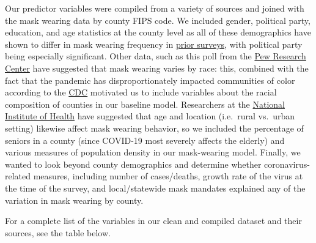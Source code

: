 \documentclass[
]{article}
\begin{document}
Our predictor variables were compiled from a variety of sources and
joined with the mask wearing data by county FIPS code. We included
gender, political party, education, and age statistics at the county
level as all of these demographics have shown to differ in mask wearing
frequency in
\href{https://news.gallup.com/poll/315590/americans-face-mask-usage-varies-greatly-demographics.aspx}{prior
surveys}, with political party being especially significant. Other data,
such as this poll from the
\href{https://www.pewresearch.org/fact-tank/2020/06/23/most-americans-say-they-regularly-wore-a-mask-in-stores-in-the-past-month-fewer-see-others-doing-it/}{Pew
Research Center} have suggested that mask wearing varies by race: this,
combined with the fact that the pandemic has disproportionately impacted
communities of color according to the
\href{https://www.cdc.gov/mmwr/volumes/69/wr/mm6933e1.htm}{CDC}
motivated us to include variables about the racial composition of
counties in our baseline model. Researchers at the
\href{https://www.ncbi.nlm.nih.gov/pmc/articles/PMC7561164/}{National
Institute of Health} have suggested that age and location (i.e.~rural
vs.~urban setting) likewise affect mask wearing behavior, so we included
the percentage of seniors in a county (since COVID-19 most severely
affects the elderly) and various measures of population density in our
mask-wearing model. Finally, we wanted to look beyond county
demographics and determine whether coronavirus-related measures,
including number of cases/deaths, growth rate of the virus at the time
of the survey, and local/statewide mask mandates explained any of the
variation in mask wearing by county.

For a complete list of the variables in our clean and compiled dataset
and their sources, see the table below.
\end{document}
